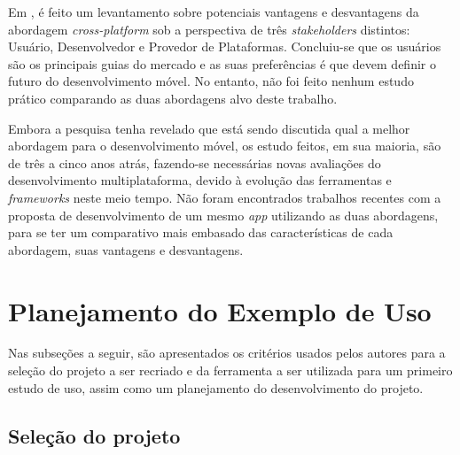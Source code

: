 Em , é feito um levantamento sobre potenciais vantagens e desvantagens da abordagem \textit{cross-platform} sob a 
perspectiva de três \textit{stakeholders} distintos: Usuário, Desenvolvedor e Provedor de Plataformas. Concluiu-se que os usuários são os principais
guias do mercado e as suas preferências é que devem definir o futuro do desenvolvimento móvel. No entanto, não foi feito nenhum estudo prático comparando
as duas abordagens alvo deste trabalho.

Embora a pesquisa tenha revelado que está sendo discutida qual a melhor abordagem para o desenvolvimento móvel, os estudo feitos, em sua maioria, são de três a cinco 
anos atrás, fazendo-se necessárias novas avaliações do desenvolvimento multiplataforma, devido à evolução das ferramentas e \textit{frameworks} neste meio tempo.
Não foram encontrados trabalhos recentes com a proposta de desenvolvimento de um mesmo \textit{app} utilizando as duas abordagens, para se ter um comparativo mais embasado das
características de cada abordagem, suas vantagens e desvantagens.
 
\begin{comment}
Falar que tem mt trabalho comparativo de nativo e cross, mas não refletem a atualidades, pois mudou muito em poucos anos.
e nao ha um estudo comparativo
tenho 3 plataformas, o cross surgiu como uma solucao, e queremos confirmar se eh mesmo uma solucao
da pra confiar nessa abordagem pra todos os desenvolvimentos de apps?    
\end{comment}

\section{Planejamento do Exemplo de Uso} \label{section:planejamentoestudodecaso}

Nas subseções a seguir, são apresentados os critérios usados pelos autores para a seleção do projeto a ser recriado e da ferramenta a ser utilizada para um primeiro estudo de uso, assim como um planejamento
do desenvolvimento do projeto.

\subsection{Seleção do projeto} \label{subsection:selecaodoprojeto}

